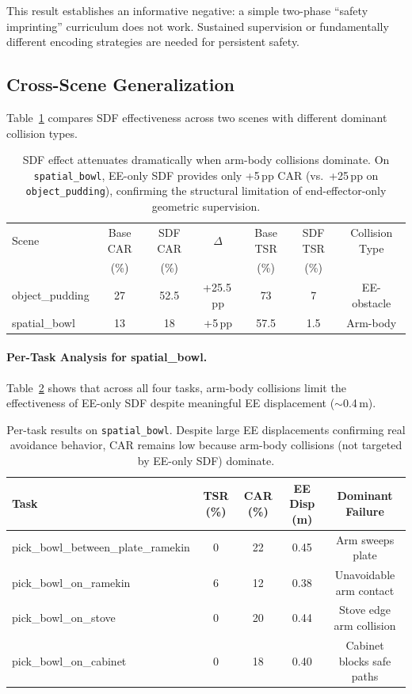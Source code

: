 \documentclass[10pt,twocolumn]{article}
\begin{document}
This result establishes an informative negative: a simple two-phase ``safety imprinting'' curriculum does not work. Sustained supervision or fundamentally different encoding strategies are needed for persistent safety.

\subsection{Cross-Scene Generalization}
\label{sec:cross_scene}

Table~\ref{tab:cross_scene} compares SDF effectiveness across two scenes with different dominant collision types.

\begin{table}[h]
\centering
\caption{SDF effect attenuates dramatically when arm-body collisions dominate. On \texttt{spatial\_bowl}, EE-only SDF provides only +5\,pp CAR (vs.\ +25\,pp on \texttt{object\_pudding}), confirming the structural limitation of end-effector-only geometric supervision.}
\label{tab:cross_scene}
\small
\begin{tabular}{lcccccc}
\toprule
Scene & Base CAR & SDF CAR & $\Delta$ & Base TSR & SDF TSR & Collision Type \\
 & (\%) & (\%) & & (\%) & (\%) & \\
\midrule
object\_pudding & 27 & 52.5 & +25.5\,pp & 73 & 7 & EE-obstacle \\
spatial\_bowl & 13 & 18 & +5\,pp & 57.5 & 1.5 & Arm-body \\
\bottomrule
\end{tabular}
\end{table}

\paragraph{Per-Task Analysis for spatial\_bowl.}
Table~\ref{tab:spatial_tasks} shows that across all four tasks, arm-body collisions limit the effectiveness of EE-only SDF despite meaningful EE displacement ($\sim$0.4\,m).

\begin{table}[h]
\centering
\caption{Per-task results on \texttt{spatial\_bowl}. Despite large EE displacements confirming real avoidance behavior, CAR remains low because arm-body collisions (not targeted by EE-only SDF) dominate.}
\label{tab:spatial_tasks}
\small
\begin{tabular}{lcccc}
\toprule
Task & TSR (\%) & CAR (\%) & EE Disp (m) & Dominant Failure \\
\midrule
pick\_bowl\_between\_plate\_ramekin & 0 & 22 & 0.45 & Arm sweeps plate \\
pick\_bowl\_on\_ramekin & 6 & 12 & 0.38 & Unavoidable arm contact \\
pick\_bowl\_on\_stove & 0 & 20 & 0.44 & Stove edge arm collision \\
pick\_bowl\_on\_cabinet & 0 & 18 & 0.40 & Cabinet blocks safe paths \\
\bottomrule
\end{tabular}
\end{table}
\end{document}
